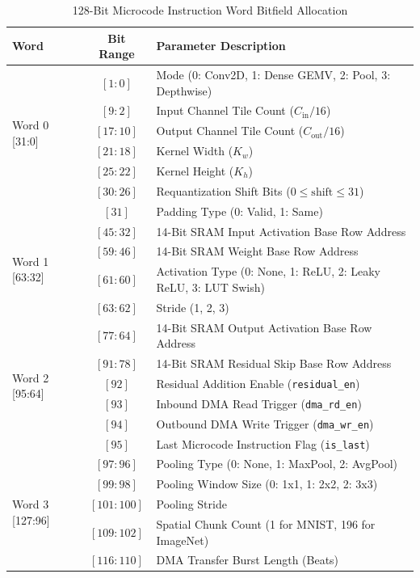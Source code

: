 \documentclass[10pt,journal,compsoc]{IEEEtran}
\begin{document}
\begin{table}[t]
\caption{128-Bit Microcode Instruction Word Bitfield Allocation}
\label{tab:microcode}
\centering
\small
\begin{tabular}{lcl}
\toprule
\textbf{Word} & \textbf{Bit Range} & \textbf{Parameter Description} \\
\midrule
\multirow{6}{*}{Word 0 [31:0]} & $[1:0]$ & Mode (0: Conv2D, 1: Dense GEMV, 2: Pool, 3: Depthwise) \\
 & $[9:2]$ & Input Channel Tile Count ($C_{\text{in}} / 16$) \\
 & $[17:10]$ & Output Channel Tile Count ($C_{\text{out}} / 16$) \\
 & $[21:18]$ & Kernel Width ($K_w$) \\
 & $[25:22]$ & Kernel Height ($K_h$) \\
 & $[30:26]$ & Requantization Shift Bits ($0 \le \text{shift} \le 31$) \\
 & $[31]$ & Padding Type (0: Valid, 1: Same) \\
\midrule
\multirow{4}{*}{Word 1 [63:32]} & $[45:32]$ & 14-Bit SRAM Input Activation Base Row Address \\
 & $[59:46]$ & 14-Bit SRAM Weight Base Row Address \\
 & $[61:60]$ & Activation Type (0: None, 1: ReLU, 2: Leaky ReLU, 3: LUT Swish) \\
 & $[63:62]$ & Stride (1, 2, 3) \\
\midrule
\multirow{6}{*}{Word 2 [95:64]} & $[77:64]$ & 14-Bit SRAM Output Activation Base Row Address \\
 & $[91:78]$ & 14-Bit SRAM Residual Skip Base Row Address \\
 & $[92]$ & Residual Addition Enable (\texttt{residual\_en}) \\
 & $[93]$ & Inbound DMA Read Trigger (\texttt{dma\_rd\_en}) \\
 & $[94]$ & Outbound DMA Write Trigger (\texttt{dma\_wr\_en}) \\
 & $[95]$ & Last Microcode Instruction Flag (\texttt{is\_last}) \\
\midrule
\multirow{5}{*}{Word 3 [127:96]} & $[97:96]$ & Pooling Type (0: None, 1: MaxPool, 2: AvgPool) \\
 & $[99:98]$ & Pooling Window Size (0: 1x1, 1: 2x2, 2: 3x3) \\
 & $[101:100]$ & Pooling Stride \\
 & $[109:102]$ & Spatial Chunk Count (1 for MNIST, 196 for ImageNet) \\
 & $[116:110]$ & DMA Transfer Burst Length (Beats) \\
\bottomrule
\end{tabular}
\end{table}
\end{document}
